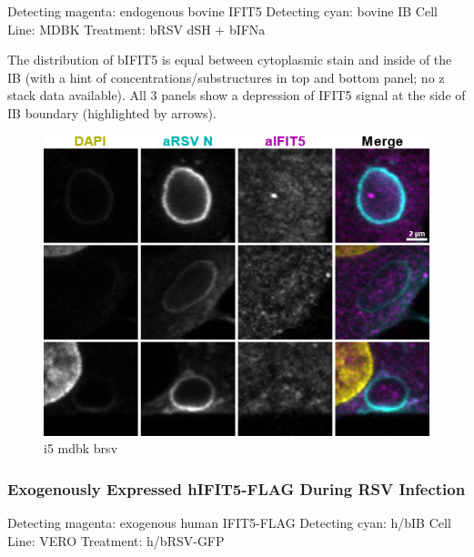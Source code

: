  \label{bIFIT5 Localisation During h/bRSV Infection}
Detecting magenta: endogenous bovine IFIT5 \newline
Detecting cyan: bovine IB \newline
Cell Line: MDBK \newline
Treatment: bRSV dSH + bIFNa \newline

The distribution of bIFIT5 is equal between cytoplasmic stain and inside of the IB (with a hint of concentrations/substructures in top and bottom panel; no z stack data available). All 3 panels show a depression of IFIT5 signal at the side of IB boundary (highlighted by arrows).

\begin{figure}
    \centering
    \includegraphics[width=1\linewidth]{08. Chapter 3/Figs/05. IFIT5/04. mdbk brsv.png}
    \caption[i5 mdbk brsv]{i5 mdbk brsv}
    \label{i5 mdbk brsv}
\end{figure}

\subsubsection{Exogenously Expressed hIFIT5-FLAG During RSV Infection} \label{Exogenously Expressed hIFIT5-FLAG During RSV Infection}
Detecting magenta: exogenous human IFIT5-FLAG \newline
Detecting cyan: h/bIB \newline
Cell Line: VERO \newline
Treatment: h/bRSV-GFP \newline

